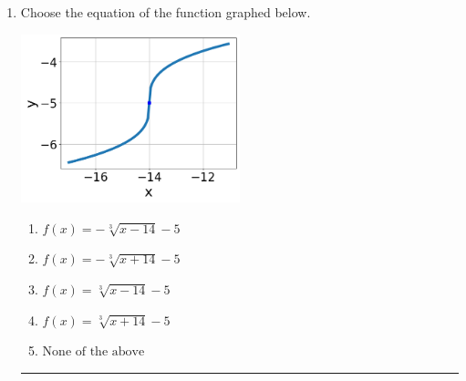 \documentclass[14pt]{extbook}
\newcommand{\litem}[1]{\item#1\hspace*{-1cm}\rule{\textwidth}{0.4pt}}
\begin{document}
\begin{enumerate}
\litem{
Choose the equation of the function graphed below.
\begin{center}
    \includegraphics[width=0.5\textwidth]{../Figures/radicalGraphToEquationC.png}
\end{center}
\begin{enumerate}[label=\Alph*.]
\item \( f(x) = - \sqrt[3]{x - 14} - 5 \)
\item \( f(x) = - \sqrt[3]{x + 14} - 5 \)
\item \( f(x) = \sqrt[3]{x - 14} - 5 \)
\item \( f(x) = \sqrt[3]{x + 14} - 5 \)
\item \( \text{None of the above} \)


\end{enumerate}}
\end{enumerate}
\end{document}
